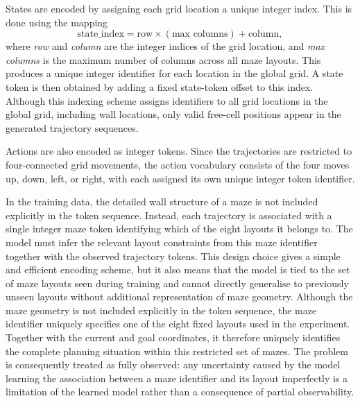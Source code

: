 ﻿\documentclass[12pt,a4paper]{article}
\theoremstyle{definition}
\begin{document}
States are encoded by assigning each grid location a unique integer index. This is done using the
mapping
\begin{equation}
\text{state\_index} = \text{row} \times (\text{max columns}) + \text{column},
\end{equation}
where \textit{row} and \textit{column} are the integer indices of the grid location, 
and \textit{max columns} is the maximum number of columns across all maze layouts. This 
produces a unique integer identifier for each location in the global grid. A state token 
is then obtained by adding a fixed state-token offset to this index. Although this indexing 
scheme assigns identifiers to all grid locations in the global grid, including wall locations, 
only valid free-cell positions appear in the generated trajectory sequences.

Actions are also encoded as integer tokens. Since the trajectories are restricted to 
four-connected grid movements, the action vocabulary consists of the four moves up, down, 
left, or right, with each assigned its own unique integer token identifier.

In the training data, the detailed wall structure of a maze is not included explicitly
in the token sequence. Instead, each trajectory is associated with a single integer maze token
identifying which of the eight layouts it belongs to. The model must infer the relevant layout 
constraints from this maze identifier together with the observed trajectory tokens. This design
choice gives a simple and efficient encoding scheme, but it also means that the model is tied 
to the set of maze layouts seen during training and cannot directly generalise to previously 
unseen layouts without additional representation of maze geometry. Although the maze geometry is 
not included explicitly in the token sequence, the
maze identifier uniquely specifies one of the eight fixed layouts used in the
experiment. Together with the current and goal coordinates, it therefore uniquely
identifies the complete planning situation within this restricted set of mazes.
The problem is consequently treated as fully observed: any uncertainty caused by
the model learning the association between a maze identifier and its layout
imperfectly is a limitation of the learned model rather than a consequence of
partial observability.
\end{document}
